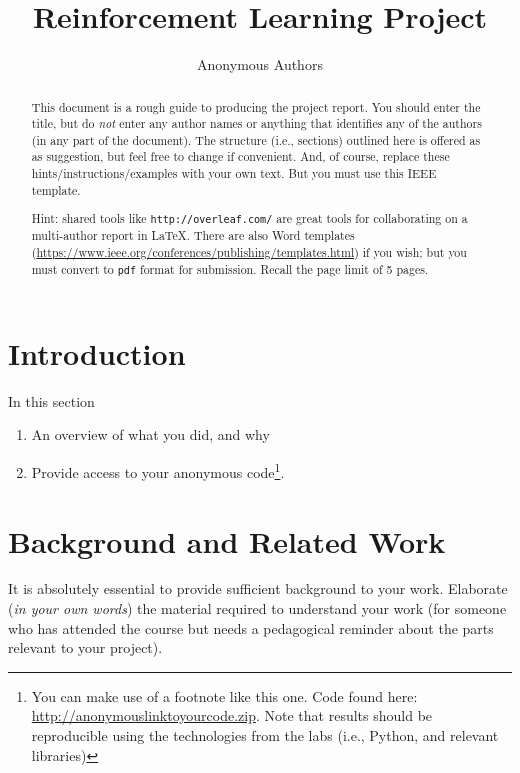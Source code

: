 \documentclass[journal, a4paper]{IEEEtran}
\begin{document}
\title{Reinforcement Learning Project}
\author{Anonymous Authors}
\maketitle

\begin{abstract}
	This document is a rough guide to producing the project report. You should enter the title, but do \emph{not} enter any author names or anything that identifies any of the authors (in any part of the document). 
	The structure (i.e., sections) outlined here is offered as as suggestion, but feel free to change if convenient. And, of course, replace these hints/instructions/examples with your own text. But you must use this IEEE template. 
	
Hint: shared tools like \texttt{http://overleaf.com/} are great tools for collaborating on a multi-author report in \LaTeX. There are also Word templates (\url{https://www.ieee.org/conferences/publishing/templates.html}) if you wish; but you must convert to \texttt{pdf} format for submission. Recall the page limit of 5 pages.  
\end{abstract}

\section{Introduction}

In this section
\begin{enumerate}
	\item An overview of what you did, and why
	\item Provide access to your anonymous code\footnote{You can make use of a footnote like this one. Code found here: \url{http://anonymouslinktoyourcode.zip}. Note that results should be reproducible using the technologies from the labs (i.e., Python, and relevant libraries)}. 
\end{enumerate}


\section{Background and Related Work}

It is absolutely essential to provide sufficient background to your work. Elaborate (\emph{in your own words}) the material required to understand your work (for someone who has attended the course but needs a pedagogical reminder about the parts relevant to your project). 
\end{document}
